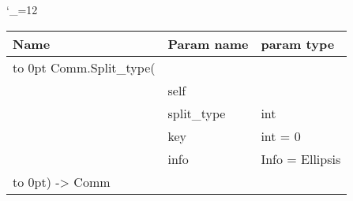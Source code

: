 \begingroup \catcode`\_=12 \tt
\begin{tabular}{lll}
\toprule
\textrm{Name}&\textrm{Param name}&\textrm{param type}\\
\midrule
\hbox to 0pt {Comm.Split_type(\hss}\\
& self\\
& split_type & int\\
& key & int = 0\\
& info & Info = Ellipsis\\
\hbox to 0pt{) -> Comm\hss}\\
\bottomrule
\end{tabular}
\endgroup
